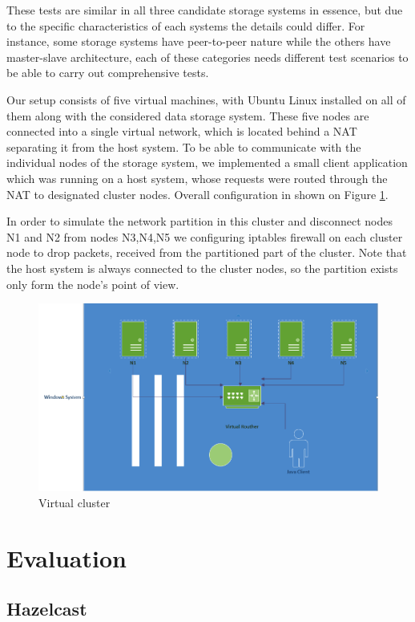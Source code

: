 \documentclass[a4paper]{article}
\begin{document}
These tests are similar in all three candidate storage systems in essence, but due to the specific characteristics of each systems the details could differ. 
For instance, some storage systems have peer-to-peer nature while the others have master-slave architecture, each of these categories needs different test scenarios to be able to carry out comprehensive tests.

Our setup consists of five virtual machines, with Ubuntu Linux installed on all of them along with the considered data storage system. 
These five nodes are connected into a single virtual network, which is located behind a NAT separating it from the host system.
To be able to communicate with the individual nodes of the storage system, we implemented a small client application which was running on a host system, whose requests were routed through the NAT to designated cluster nodes. 
Overall configuration in shown on Figure \ref{fig:cluster}. 

In order to simulate the network partition in this cluster and disconnect nodes N1 and N2 from nodes N3,N4,N5 we configuring iptables firewall on each cluster node to drop packets, received from the partitioned part of the cluster.
Note that the host system is always connected to the cluster nodes, so the partition exists only form the node's point of view.

\begin{figure}[h!]
	\centering
	\includegraphics[width=\textwidth]{cluster}
	\caption{Virtual cluster}
	\label{fig:cluster}
\end{figure}

\section{Evaluation}

\subsection{Hazelcast}
\end{document}

